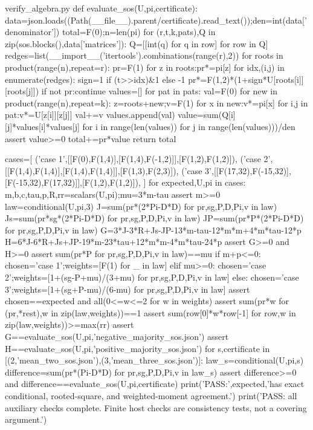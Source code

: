 \begin{filecontents*}[overwrite]{verify_algebra.py}
def evaluate_sos(U,pi,certificate):
    data=json.loads((Path(__file__).parent/certificate).read_text());den=int(data['denominator'])
    total=F(0);n=len(pi)
    for (r,t,k,pats),Q in zip(sos.blocks(),data['matrices']):
        Q=[[int(q) for q in row] for row in Q]
        redges=list(__import__('itertools').combinations(range(r),2))
        for roots in product(range(n),repeat=r):
            pr=F(1)
            for z in roots:pr*=pi[z]
            for idx,(i,j) in enumerate(redges):
                sign=1 if (t>>idx)&1 else -1
                pr*=F(1,2)*(1+sign*U[roots[i]][roots[j]])
            if not pr:continue
            values=[]
            for pat in pats:
                val=F(0)
                for new in product(range(n),repeat=k):
                    z=roots+new;v=F(1)
                    for x in new:v*=pi[x]
                    for i,j in pat:v*=U[z[i]][z[j]]
                    val+=v
                values.append(val)
            value=sum(Q[i][j]*values[i]*values[j] for i in range(len(values)) for j in range(len(values)))/den
            assert value>=0
            total+=pr*value
    return total

cases=[
    ('case 1',[[F(0),F(1,4)],[F(1,4),F(-1,2)]],[F(1,2),F(1,2)]),
    ('case 2',[[F(1,4),F(1,4)],[F(1,4),F(1,4)]],[F(1,3),F(2,3)]),
    ('case 3',[[F(17,32),F(-15,32)],[F(-15,32),F(17,32)]],[F(1,2),F(1,2)]),
]
for expected,U,pi in cases:
    m,b,c,tau,p,R,rr=scalars(U,pi);mu=3*m-tau
    assert m>=0
    law=conditional(U,pi,3)
    J=sum(pr*(2*Pi-D*D) for pr,sg,P,D,Pi,v in law)
    Js=sum(pr*sg*(2*Pi-D*D) for pr,sg,P,D,Pi,v in law)
    JP=sum(pr*P*(2*Pi-D*D) for pr,sg,P,D,Pi,v in law)
    G=3*J-3*R+Js-JP-13*m-tau-12*m*m+4*m*tau-12*p
    H=6*J-6*R+Js+JP-19*m-23*tau+12*m*m-4*m*tau-24*p
    assert G>=0 and H>=0
    assert sum(pr*P for pr,sg,P,D,Pi,v in law)==mu
    if m+p<=0:
        chosen='case 1';weights=[F(1) for _ in law]
    elif mu>=0:
        chosen='case 2';weights=[1+(sg-P+mu)/(3+mu) for pr,sg,P,D,Pi,v in law]
    else:
        chosen='case 3';weights=[1+(sg+P-mu)/(6-mu) for pr,sg,P,D,Pi,v in law]
    assert chosen==expected and all(0<=w<=2 for w in weights)
    assert sum(pr*w for (pr,*rest),w in zip(law,weights))==1
    assert sum(row[0]*w*row[-1] for row,w in zip(law,weights))>=max(rr)
    assert G==evaluate_sos(U,pi,'negative_majority_sos.json')
    assert H==evaluate_sos(U,pi,'positive_majority_sos.json')
    for s,certificate in [(2,'mean_two_sos.json'),(3,'mean_three_sos.json')]:
        law_s=conditional(U,pi,s)
        difference=sum(pr*(Pi-D*D) for pr,sg,P,D,Pi,v in law_s)
        assert difference>=0 and difference==evaluate_sos(U,pi,certificate)
    print('PASS:',expected,'has exact conditional, rooted-square, and weighted-moment agreement.')
print('PASS: all auxiliary checks complete. Finite host checks are consistency tests, not a covering argument.')
\end{filecontents*}

